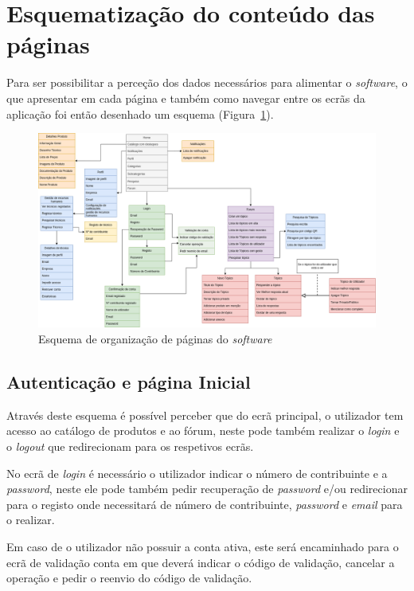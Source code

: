 \section{Esquematização do conteúdo das páginas}

Para ser possibilitar a perceção dos dados necessários para alimentar o \textit{software}, o que apresentar em cada página e também como navegar entre os ecrãs da aplicação foi então desenhado um esquema 
(Figura~\ref{fig:3}).

\begin{figure}[htb]
  \centering
  
  \includegraphics[width=\textwidth]{images/Arquiteturas/diagrama_superficial_de_aplicacao.png}
  \caption{Esquema de organização de páginas do \textit{software}}
  \label{fig:3}
\end{figure}

\newpage

\subsection{Autenticação e página Inicial}

Através deste esquema é possível perceber que do ecrã principal, o utilizador tem acesso ao 
catálogo de produtos e ao fórum, neste pode também realizar o \textit{login} e o \textit{logout} que redirecionam para os respetivos ecrãs.

No ecrã de \textit{login} é necessário o utilizador indicar o número de contribuinte e a \textit{password}, neste ele pode também pedir recuperação de \textit{password} e/ou redirecionar para o registo onde necessitará de número de contribuinte, \textit{password} e \textit{email} para o realizar.

Em caso de o utilizador não possuir a conta ativa, este será encaminhado para o ecrã de validação conta em que deverá indicar o código de validação, cancelar a operação e pedir o reenvio do código de validação.


